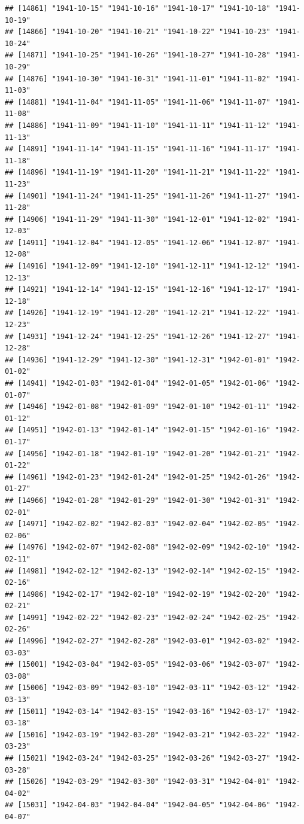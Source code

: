 \documentclass{article}\usepackage[]{graphicx}\usepackage[]{color}
\makeatletter
\newenvironment{kframe}{%
 \def\at@end@of@kframe{}%
 \ifinner\ifhmode%
  \def\at@end@of@kframe{\end{minipage}}%
  \begin{minipage}{\columnwidth}%
 \fi\fi%
 \def\FrameCommand##1{\hskip\@totalleftmargin \hskip-\fboxsep
 \colorbox{shadecolor}{##1}\hskip-\fboxsep
     \hskip-\linewidth \hskip-\@totalleftmargin \hskip\columnwidth}%
 \MakeFramed {\advance\hsize-\width
   \@totalleftmargin\z@ \linewidth\hsize
   \@setminipage}}%
 {\par\unskip\endMakeFramed%
 \at@end@of@kframe}
\newenvironment{knitrout}{}{} %
\makeatother
\begin{document}
\begin{description}
\begin{knitrout}
\begin{kframe}
\begin{verbatim}
## [14861] "1941-10-15" "1941-10-16" "1941-10-17" "1941-10-18" "1941-10-19"
## [14866] "1941-10-20" "1941-10-21" "1941-10-22" "1941-10-23" "1941-10-24"
## [14871] "1941-10-25" "1941-10-26" "1941-10-27" "1941-10-28" "1941-10-29"
## [14876] "1941-10-30" "1941-10-31" "1941-11-01" "1941-11-02" "1941-11-03"
## [14881] "1941-11-04" "1941-11-05" "1941-11-06" "1941-11-07" "1941-11-08"
## [14886] "1941-11-09" "1941-11-10" "1941-11-11" "1941-11-12" "1941-11-13"
## [14891] "1941-11-14" "1941-11-15" "1941-11-16" "1941-11-17" "1941-11-18"
## [14896] "1941-11-19" "1941-11-20" "1941-11-21" "1941-11-22" "1941-11-23"
## [14901] "1941-11-24" "1941-11-25" "1941-11-26" "1941-11-27" "1941-11-28"
## [14906] "1941-11-29" "1941-11-30" "1941-12-01" "1941-12-02" "1941-12-03"
## [14911] "1941-12-04" "1941-12-05" "1941-12-06" "1941-12-07" "1941-12-08"
## [14916] "1941-12-09" "1941-12-10" "1941-12-11" "1941-12-12" "1941-12-13"
## [14921] "1941-12-14" "1941-12-15" "1941-12-16" "1941-12-17" "1941-12-18"
## [14926] "1941-12-19" "1941-12-20" "1941-12-21" "1941-12-22" "1941-12-23"
## [14931] "1941-12-24" "1941-12-25" "1941-12-26" "1941-12-27" "1941-12-28"
## [14936] "1941-12-29" "1941-12-30" "1941-12-31" "1942-01-01" "1942-01-02"
## [14941] "1942-01-03" "1942-01-04" "1942-01-05" "1942-01-06" "1942-01-07"
## [14946] "1942-01-08" "1942-01-09" "1942-01-10" "1942-01-11" "1942-01-12"
## [14951] "1942-01-13" "1942-01-14" "1942-01-15" "1942-01-16" "1942-01-17"
## [14956] "1942-01-18" "1942-01-19" "1942-01-20" "1942-01-21" "1942-01-22"
## [14961] "1942-01-23" "1942-01-24" "1942-01-25" "1942-01-26" "1942-01-27"
## [14966] "1942-01-28" "1942-01-29" "1942-01-30" "1942-01-31" "1942-02-01"
## [14971] "1942-02-02" "1942-02-03" "1942-02-04" "1942-02-05" "1942-02-06"
## [14976] "1942-02-07" "1942-02-08" "1942-02-09" "1942-02-10" "1942-02-11"
## [14981] "1942-02-12" "1942-02-13" "1942-02-14" "1942-02-15" "1942-02-16"
## [14986] "1942-02-17" "1942-02-18" "1942-02-19" "1942-02-20" "1942-02-21"
## [14991] "1942-02-22" "1942-02-23" "1942-02-24" "1942-02-25" "1942-02-26"
## [14996] "1942-02-27" "1942-02-28" "1942-03-01" "1942-03-02" "1942-03-03"
## [15001] "1942-03-04" "1942-03-05" "1942-03-06" "1942-03-07" "1942-03-08"
## [15006] "1942-03-09" "1942-03-10" "1942-03-11" "1942-03-12" "1942-03-13"
## [15011] "1942-03-14" "1942-03-15" "1942-03-16" "1942-03-17" "1942-03-18"
## [15016] "1942-03-19" "1942-03-20" "1942-03-21" "1942-03-22" "1942-03-23"
## [15021] "1942-03-24" "1942-03-25" "1942-03-26" "1942-03-27" "1942-03-28"
## [15026] "1942-03-29" "1942-03-30" "1942-03-31" "1942-04-01" "1942-04-02"
## [15031] "1942-04-03" "1942-04-04" "1942-04-05" "1942-04-06" "1942-04-07"

\end{verbatim}
\end{kframe}
\end{knitrout}
\end{description}
\end{document}
